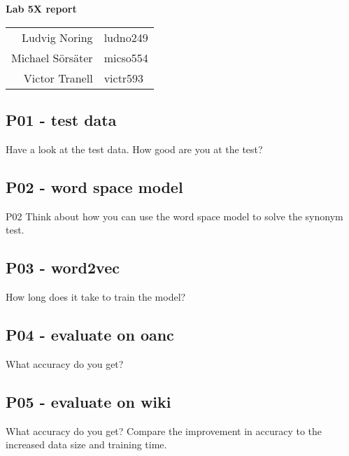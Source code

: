 \documentclass[12pt,a4paper]{article}
\begin{document}
\begin{center}

	\vspace{0.7cm}
	\LARGE
	\textbf{Lab 5X report }

	\Large
	\begin{table}[h]
	\centering
		\begin{tabular}{ r l }
		Ludvig Noring & ludno249 \\ Michael Sörsäter & micso554 \\ Victor Tranell &  victr593 \\
		\end{tabular}
	\end{table}
\end{center}

\subsection*{P01 - test data}
Have a look at the test data. How good are you at the test?
\subsection*{P02 - word space model}
P02 Think about how you can use the word space model to solve the synonym test.
\subsection*{P03 - word2vec}
How long does it take to train the model?
\subsection*{P04 - evaluate on oanc}
What accuracy do you get?
\subsection*{P05 - evaluate on wiki}
What accuracy do you get?
Compare the improvement in accuracy to the increased data size and training time.
\end{document}
